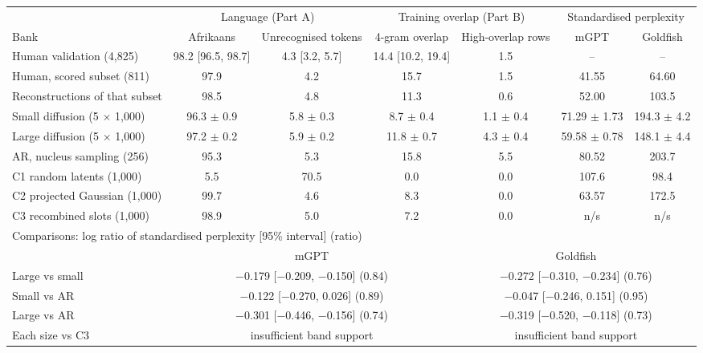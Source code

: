 \documentclass[11pt,a4paper]{article}
\begin{document}
\begin{table}[t]
\centering
\small
\begin{adjustbox}{max width=\textwidth}
\begin{tabular}{lcccccc}
\toprule
& \multicolumn{2}{c}{Language (Part A)} & \multicolumn{2}{c}{Training overlap (Part B)} & \multicolumn{2}{c}{Standardised perplexity} \\
\cmidrule(lr){2-3}\cmidrule(lr){4-5}\cmidrule(lr){6-7}
Bank & Afrikaans & Unrecognised tokens & 4-gram overlap & High-overlap rows & mGPT & Goldfish \\
\midrule
Human validation (4,825) & 98.2 [96.5, 98.7] & 4.3 [3.2, 5.7] & 14.4 [10.2, 19.4] & 1.5 & -- & -- \\
Human, scored subset (811) & 97.9 & 4.2 & 15.7 & 1.5 & 41.55 & 64.60 \\
Reconstructions of that subset & 98.5 & 4.8 & 11.3 & 0.6 & 52.00 & 103.5 \\
Small diffusion (5 $\times$ 1,000) & 96.3 $\pm$ 0.9 & 5.8 $\pm$ 0.3 & 8.7 $\pm$ 0.4 & 1.1 $\pm$ 0.4 & 71.29 $\pm$ 1.73 & 194.3 $\pm$ 4.2 \\
Large diffusion (5 $\times$ 1,000) & 97.2 $\pm$ 0.2 & 5.9 $\pm$ 0.2 & 11.8 $\pm$ 0.7 & 4.3 $\pm$ 0.4 & 59.58 $\pm$ 0.78 & 148.1 $\pm$ 4.4 \\
AR, nucleus sampling (256) & 95.3 & 5.3 & 15.8 & 5.5 & 80.52 & 203.7 \\
C1 random latents (1,000) & 5.5 & 70.5 & 0.0 & 0.0 & 107.6 & 98.4 \\
C2 projected Gaussian (1,000) & 99.7 & 4.6 & 8.3 & 0.0 & 63.57 & 172.5 \\
C3 recombined slots (1,000) & 98.9 & 5.0 & 7.2 & 0.0 & n/s & n/s \\
\midrule
\multicolumn{7}{l}{Comparisons: log ratio of standardised perplexity [95\% interval] (ratio)} \\
\midrule
& \multicolumn{3}{c}{mGPT} & \multicolumn{3}{c}{Goldfish} \\
Large vs small & \multicolumn{3}{c}{$-$0.179 [$-$0.209, $-$0.150] (0.84)} & \multicolumn{3}{c}{$-$0.272 [$-$0.310, $-$0.234] (0.76)} \\
Small vs AR & \multicolumn{3}{c}{$-$0.122 [$-$0.270, 0.026] (0.89)} & \multicolumn{3}{c}{$-$0.047 [$-$0.246, 0.151] (0.95)} \\
Large vs AR & \multicolumn{3}{c}{$-$0.301 [$-$0.446, $-$0.156] (0.74)} & \multicolumn{3}{c}{$-$0.319 [$-$0.520, $-$0.118] (0.73)} \\
Each size vs C3 & \multicolumn{3}{c}{insufficient band support} & \multicolumn{3}{c}{insufficient band support} \\

\end{tabular}
\end{adjustbox}
\end{table}
\end{document}
